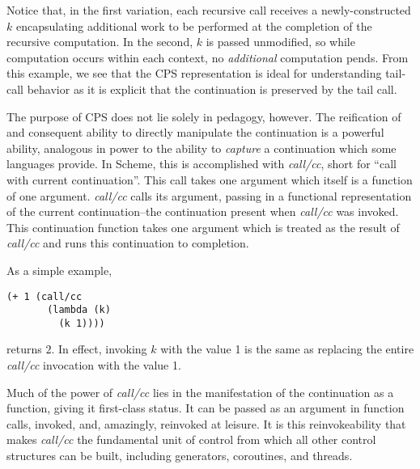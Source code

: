 \documentclass[ms]{byuprop}
\newcounter{example}
\begin{document}
Notice that, in the first variation, each recursive call receives a newly-constructed 
$k$ encapsulating additional work to be performed at the completion of the recursive 
computation. In the second, $k$ is passed unmodified, so while computation occurs 
within each context, no \emph{additional} computation pends. From this example, we 
see that the CPS representation is ideal for understanding tail-call behavior as it 
is explicit that the continuation is preserved by the tail call.

The purpose of CPS does not lie solely in pedagogy, however. The reification of and 
consequent ability to directly manipulate the continuation is a powerful ability, 
analogous in power to the ability to \emph{capture} a continuation which some 
languages provide. In Scheme, this is accomplished with \emph{call/cc}, short for 
``call with current continuation''. This call takes one argument which itself is a 
function of one argument. \emph{call/cc} calls its argument, passing in a functional 
representation of the current continuation--the continuation present when \emph{call/cc} 
was invoked. This continuation function takes one argument which is treated as the result 
of \emph{call/cc} and runs this continuation to completion.

As a simple example,
\begin{verbatim}
(+ 1 (call/cc
       (lambda (k)
         (k 1))))
\end{verbatim}
returns $2$. In effect, invoking $k$ with the value 1 is the same as replacing 
the entire \emph{call/cc} invocation with the value 1.

Much of the power of \emph{call/cc} lies in the manifestation of the continuation 
as a function, giving it first-class status. It can be passed as an argument in 
function calls, invoked, and, amazingly, reinvoked at leisure. It is this 
reinvokeability that makes \emph{call/cc} the fundamental unit of control from 
which all other control structures can be built, including generators, coroutines, 
and threads.

\end{document}

